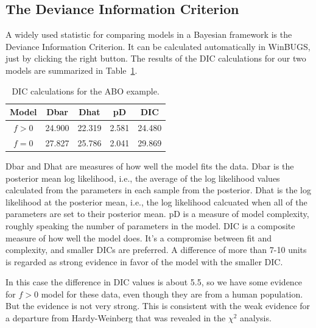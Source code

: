 \subsection*{The Deviance Information Criterion}

A widely used statistic for comparing models in a Bayesian framework
is the Deviance Information Criterion. It can be calculated automatically in WinBUGS, just by
clicking the right button. The results of the DIC calculations for our
two models are summarized in Table~\ref{table:ABO-dic}.

\begin{table}
\begin{center}
\begin{tabular}{c|cccc}
\hline\hline
Model   & Dbar   & Dhat   & pD    & DIC \\
\hline
$f > 0$ & 24.900 & 22.319 & 2.581 & 24.480 \\
$f = 0$ & 27.827 & 25.786 & 2.041 & 29.869 \\
\hline
\end{tabular}
\end{center}
\caption{DIC calculations for the ABO example.}\label{table:ABO-dic}
\end{table}

Dbar and Dhat are measures of how well the model fits the data. Dbar
is the posterior mean log likelihood, i.e., the average of the log
likelihood values calculated from the parameters in each sample from
the posterior. Dhat is the log likelihood at the posterior mean, i.e.,
the log likelihood calcuated when all of the parameters are set to
their posterior mean. pD is a measure of model complexity, roughly
speaking the number of parameters in the model. DIC is a composite
measure of how well the model does. It's a compromise between fit and
complexity, and smaller DICs are preferred. A difference of more than
7-10 units is regarded as strong evidence in favor of the model with
the smaller DIC. 

In this case the difference in DIC values is about 5.5, so we have
some evidence for $f > 0$ model for these data, even though they are
from a human population. But the evidence is not very strong. This is
consistent with the weak evidence for a departure from Hardy-Weinberg
that was revealed in the $\chi^2$ analysis.

